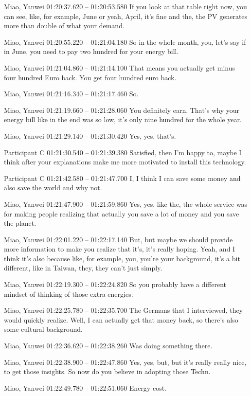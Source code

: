 {Miao, Yanwei 01:20:37.620 -- 01:20:53.580
If you look at that table right now, you can see, like, for example, June or yeah, April, it's fine and the, the PV generates more than double of what your demand.

Miao, Yanwei 01:20:55.220 -- 01:21:04.180
So in the whole month, you, let's say if in June, you need to pay two hundred for your energy bill.

Miao, Yanwei 01:21:04.860 -- 01:21:14.100
That means you actually get minus four hundred Euro back. You get four hundred euro back.

Miao, Yanwei 01:21:16.340 -- 01:21:17.460
So.

Miao, Yanwei 01:21:19.660 -- 01:21:28.060
You definitely earn. That's why your energy bill like in the end was so low, it's only nine hundred for the whole year.

Miao, Yanwei 01:21:29.140 -- 01:21:30.420
Yes, yes, that's.

Participant C 01:21:30.540 -- 01:21:39.380
Satisfied, then I'm happy to, maybe I think after your explanations make me more motivated to install this technology.

Participant C 01:21:42.580 -- 01:21:47.700
I, I think I can save some money and also save the world and why not.

Miao, Yanwei 01:21:47.900 -- 01:21:59.860
Yes, yes, like the, the whole service was for making people realizing that actually you save a lot of money and you save the planet.

Miao, Yanwei 01:22:01.220 -- 01:22:17.140
But, but maybe we should provide more information to make you realize that it's, it's really hoping. Yeah, and I think it's also because like, for example, you, you're your background, it's a bit different, like in Taiwan, they, they can't just simply.

Miao, Yanwei 01:22:19.300 -- 01:22:24.820
So you probably have a different mindset of thinking of those extra energies.

Miao, Yanwei 01:22:25.780 -- 01:22:35.700
The Germans that I interviewed, they would quickly realize. Well, I can actually get that money back, so there's also some cultural background.

Miao, Yanwei 01:22:36.620 -- 01:22:38.260
Was doing something there.

Miao, Yanwei 01:22:38.900 -- 01:22:47.860
Yes, yes, but, but it's really really nice, to get those insights. So now do you believe in adopting those Techn.

Miao, Yanwei 01:22:49.780 -- 01:22:51.060
Energy cost.

}
